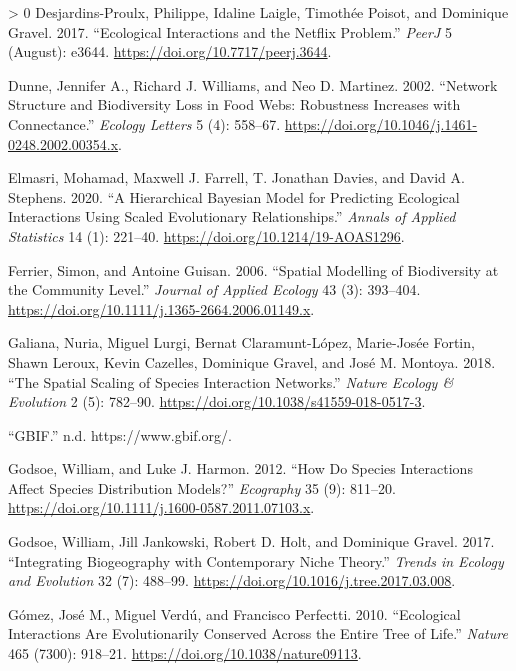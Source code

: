 \documentclass[12pt]{article}
\newlength{\cslhangindent}
\newenvironment{CSLReferences}[3] %
 {%
  \setlength{\parindent}{0pt}
  \ifodd #1 \everypar{\setlength{\hangindent}{\cslhangindent}}\ignorespaces\fi
  \ifnum #2 > 0
  \setlength{\parskip}{#2\baselineskip}
  \fi
 }%
 {}
\begin{document}
\begin{CSLReferences}{1}{0}
\leavevmode\hypertarget{ref-Desjardins-Proulx2017EcoInt}{}%
Desjardins-Proulx, Philippe, Idaline Laigle, Timothée Poisot, and
Dominique Gravel. 2017. {``Ecological Interactions and the Netflix
Problem.''} \emph{PeerJ} 5 (August): e3644.
\url{https://doi.org/10.7717/peerj.3644}.

\leavevmode\hypertarget{ref-Dunne2002NetStr}{}%
Dunne, Jennifer A., Richard J. Williams, and Neo D. Martinez. 2002.
{``Network Structure and Biodiversity Loss in Food Webs: Robustness
Increases with Connectance.''} \emph{Ecology Letters} 5 (4): 558--67.
\url{https://doi.org/10.1046/j.1461-0248.2002.00354.x}.

\leavevmode\hypertarget{ref-Elmasri2020HieBay}{}%
Elmasri, Mohamad, Maxwell J. Farrell, T. Jonathan Davies, and David A.
Stephens. 2020. {``A Hierarchical Bayesian Model for Predicting
Ecological Interactions Using Scaled Evolutionary Relationships.''}
\emph{Annals of Applied Statistics} 14 (1): 221--40.
\url{https://doi.org/10.1214/19-AOAS1296}.

\leavevmode\hypertarget{ref-Ferrier2006SpaMod}{}%
Ferrier, Simon, and Antoine Guisan. 2006. {``Spatial Modelling of
Biodiversity at the Community Level.''} \emph{Journal of Applied
Ecology} 43 (3): 393--404.
\url{https://doi.org/10.1111/j.1365-2664.2006.01149.x}.

\leavevmode\hypertarget{ref-Galiana2018SpaSca}{}%
Galiana, Nuria, Miguel Lurgi, Bernat Claramunt-López, Marie-Josée
Fortin, Shawn Leroux, Kevin Cazelles, Dominique Gravel, and José M.
Montoya. 2018. {``The Spatial Scaling of Species Interaction
Networks.''} \emph{Nature Ecology \& Evolution} 2 (5): 782--90.
\url{https://doi.org/10.1038/s41559-018-0517-3}.

\leavevmode\hypertarget{ref-Gbi}{}%
{``GBIF.''} n.d. https://www.gbif.org/.

\leavevmode\hypertarget{ref-Godsoe2012HowSpe}{}%
Godsoe, William, and Luke J. Harmon. 2012. {``How Do Species
Interactions Affect Species Distribution Models?''} \emph{Ecography} 35
(9): 811--20. \url{https://doi.org/10.1111/j.1600-0587.2011.07103.x}.

\leavevmode\hypertarget{ref-Godsoe2017IntBio}{}%
Godsoe, William, Jill Jankowski, Robert D. Holt, and Dominique Gravel.
2017. {``Integrating Biogeography with Contemporary Niche Theory.''}
\emph{Trends in Ecology and Evolution} 32 (7): 488--99.
\url{https://doi.org/10.1016/j.tree.2017.03.008}.

\leavevmode\hypertarget{ref-Gomez2010EcoInt}{}%
Gómez, José M., Miguel Verdú, and Francisco Perfectti. 2010.
{``Ecological Interactions Are Evolutionarily Conserved Across the
Entire Tree of Life.''} \emph{Nature} 465 (7300): 918--21.
\url{https://doi.org/10.1038/nature09113}.


\end{CSLReferences}
\end{document}
